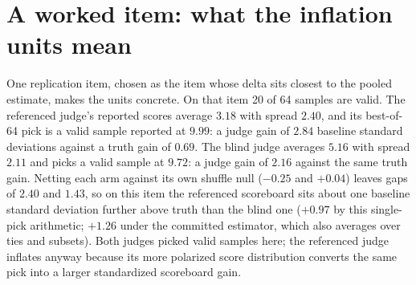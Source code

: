 \documentclass[11pt]{article}
\begin{document}
\section{A worked item: what the inflation units mean}
\label{app:worked}

One replication item, chosen as the item whose delta sits closest to the pooled estimate, makes the units concrete.
On that item 20 of 64 samples are valid.
The referenced judge's reported scores average $3.18$ with spread $2.40$, and its best-of-64 pick is a valid sample reported at $9.99$: a judge gain of $2.84$ baseline standard deviations against a truth gain of $0.69$.
The blind judge averages $5.16$ with spread $2.11$ and picks a valid sample at $9.72$: a judge gain of $2.16$ against the same truth gain.
Netting each arm against its own shuffle null ($-0.25$ and $+0.04$) leaves gaps of $2.40$ and $1.43$, so on this item the referenced scoreboard sits about one baseline standard deviation further above truth than the blind one ($+0.97$ by this single-pick arithmetic; $+1.26$ under the committed estimator, which also averages over ties and subsets).
Both judges picked valid samples here; the referenced judge inflates anyway because its more polarized score distribution converts the same pick into a larger standardized scoreboard gain.
\end{document}
